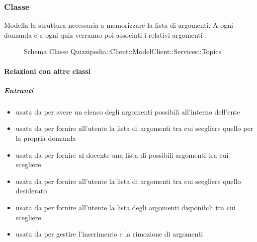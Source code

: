 \subsubsection{Classe }
Modella la struttura necessaria a memorizzare la lista di argomenti. A ogni domanda e a ogni quiz verranno poi associati i relativi argomenti .
\begin{figure}[H]
\centering
\noindent{}
\caption[Schema Classe Topics]{Schema Classe Quizzipedia::Client::ModelClient::Services::Topics}
\end{figure}
\paragraph{Relazioni con altre classi}
\subparagraph{Entranti}
\begin{itemize}
\item usata da  per avere un elenco degli argomenti possibili all'interno dell'ente
\item usata da  per fornire all'utente la lista di argomenti tra cui scegliere quello per la propria domanda
\item usata da  per fornire al docente una lista di possibili argomenti tra cui scegliere
\item usata da  per fornire all'utente la lista di argomenti tra cui scegliere quello desiderato
\item usata da  per fornire all'utente la lista degli argomenti disponibili tra cui scegliere
\item usata da  per gestire l'inserimento e la rimozione di argomenti
\end{itemize}
